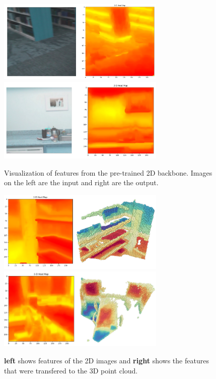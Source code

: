 \documentclass[10pt,twocolumn,letterpaper]{article}
\begin{document}
\begin{figure}
    \centering
    \includegraphics[width=8cm]{images/experiments/25.02.2022-image-pretrain-vis2.png}
    \includegraphics[width=8cm]{images/experiments/25.02.2022-image-pretrain-vis1.png}
    \caption{Visualization of features from the pre-trained 2D backbone. Images on the left are the input and right are the output.}
    \label{fig:features2dvis}
\end{figure}

\begin{figure}
    \centering
    \includegraphics[width=8cm]{images/experiments/image-to-point-vis1.png}
    \includegraphics[width=8cm]{images/experiments/image-to-point-vis2.png}
    \caption{\textbf{left} shows features of the 2D images and \textbf{right} shows the features that were transfered to the 3D point cloud.}
    \label{fig:features2d-3dvis}
\end{figure}
\end{document}
